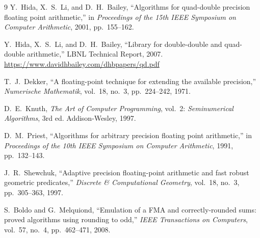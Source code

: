 \documentclass[11pt,a4paper]{article}
\begin{document}
\begin{thebibliography}{9}
Y.~Hida, X.~S.~Li, and D.~H.~Bailey,
``Algorithms for quad-double precision floating point arithmetic,''
in \textit{Proceedings of the 15th IEEE Symposium on Computer
Arithmetic}, 2001, pp.~155--162.

Y.~Hida, X.~S.~Li, and D.~H.~Bailey,
``Library for double-double and quad-double arithmetic,''
LBNL Technical Report, 2007.
\url{https://www.davidhbailey.com/dhbpapers/qd.pdf}

T.~J.~Dekker,
``A floating-point technique for extending the available precision,''
\textit{Numerische Mathematik}, vol.~18, no.~3, pp.~224--242, 1971.

D.~E.~Knuth,
\textit{The Art of Computer Programming}, vol.~2:
\textit{Seminumerical Algorithms}, 3rd ed.
Addison-Wesley, 1997.

D.~M.~Priest,
``Algorithms for arbitrary precision floating point arithmetic,''
in \textit{Proceedings of the 10th IEEE Symposium on Computer
Arithmetic}, 1991, pp.~132--143.

J.~R.~Shewchuk,
``Adaptive precision floating-point arithmetic and fast robust
geometric predicates,''
\textit{Discrete \& Computational Geometry},
vol.~18, no.~3, pp.~305--363, 1997.

S.~Boldo and G.~Melquiond,
``Emulation of a FMA and correctly-rounded sums: proved algorithms
using rounding to odd,''
\textit{IEEE Transactions on Computers},
vol.~57, no.~4, pp.~462--471, 2008.
\end{thebibliography}
\end{document}
